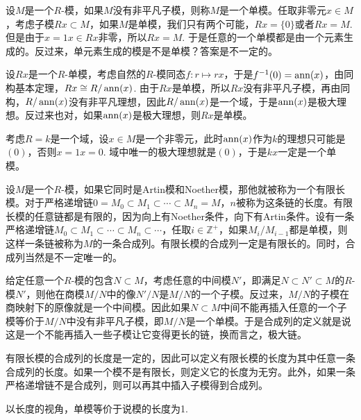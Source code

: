 \para 设$M$是一个$R$-模，如果$M$没有非平凡子模，则称$M$是一个单模。任取非零元$x\in M$，考虑子模$Rx\subset M$，如果$M$是单模，我们只有两个可能，$Rx=\{0\}$或者$Rx=M$. 但是由于$x=1x\in Rx$非零，所以$Rx=M$. 于是任意的一个单模都是由一个元素生成的。反过来，单元素生成的模是不是单模？答案是不一定的。

设$Rx$是一个$R$-单模，考虑自然的$R$-模同态$f:r\mapsto rx$，于是$f^{-1}(0)=\operatorname{ann}(x)$，由同构基本定理，$Rx\cong R/\operatorname{ann}(x)$. 由于$Rx$是单模，所以$Rx$没有非平凡子模，再由同构，$R/\operatorname{ann}(x)$没有非平凡理想，因此$R/\operatorname{ann}(x)$是一个域，于是$\operatorname{ann}(x)$是极大理想。反过来也对，如果$\operatorname{ann}(x)$是极大理想，则$Rx$是单模。

考虑$R=k$是一个域，设$x\in M$是一个非零元，此时$\operatorname{ann}(x)$作为$k$的理想只可能是$(0)$，否则$x=1x=0$. 域中唯一的极大理想就是$(0)$，于是$kx$一定是一个单模。

\para 设$M$是一个$R$-模，如果它同时是Artin模和Noether模，那他就被称为一个有限长模。对于严格递增链$0=M_0\subset M_1\subset \cdots\subset M_n=M$，$n$被称为这条链的长度。有限长模的任意链都是有限的，因为向上有Noether条件，向下有Artin条件。设有一条严格递增链$M_0\subset M_1\subset \cdots\subset M_n \subset \cdots $，任取$i\in \mathbb{Z}^+$，如果$M_{i}/M_{i-1}$都是单模，则这样一条链被称为$M$的一条合成列。有限长模的合成列一定是有限长的。同时，合成列当然是不一定唯一的。

给定任意一个$R$-模的包含$N\subset M$，考虑任意的中间模$N'$，即满足$N\subset N'\subset M$的$R$-模$N'$，则他在商模$M/N$中的像$N'/N$是$M/N$的一个子模。反过来，$M/N$的子模在商映射下的原像就是一个中间模。因此如果$N\subset M$中间不能再插入任意的一个子模等价于$M/N$中没有非平凡子模，即$M/N$是一个单模。于是合成列的定义就是说这是一个不能再插入一些子模让它变得更长的链，换而言之，极大链。

\begin{pro}
有限长模的合成列的长度是一定的，因此可以定义有限长模的长度为其中任意一条合成列的长度。如果一个模不是有限长，则定义它的长度为无穷。此外，如果一条严格递增链不是合成列，则可以再其中插入子模得到合成列。
\end{pro}

以长度的视角，单模等价于说模的长度为1.

